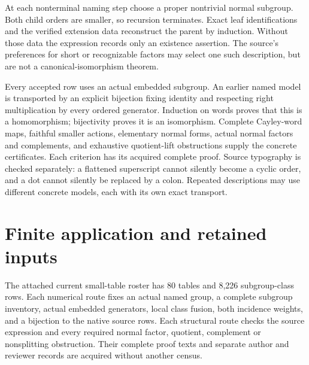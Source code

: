 \documentclass[11pt]{article}
\begin{document}
At each nonterminal naming step choose a proper nontrivial normal subgroup.
Both child orders are smaller, so recursion terminates. Exact leaf
identifications and the verified extension data reconstruct the parent by
induction. Without those data the expression records only an existence
assertion. The source's preferences for short or recognizable factors may
select one such description, but are not a canonical-isomorphism theorem.

Every accepted row uses an actual embedded subgroup. An earlier named
model is transported by an explicit bijection fixing identity and respecting
right multiplication by every ordered generator. Induction on words proves
that this is a homomorphism; bijectivity proves it is an isomorphism.
Complete Cayley-word maps, faithful smaller actions, elementary normal forms,
actual normal factors and complements, and exhaustive quotient-lift
obstructions supply the concrete certificates. Each criterion has its
acquired complete proof. Source typography is checked separately: a flattened
superscript cannot silently become a cyclic order, and a dot cannot silently
be replaced by a colon. Repeated descriptions may use different concrete
models, each with its own exact transport.

\section{Finite application and retained inputs}
The attached current small-table roster has 80 tables and 8,226 subgroup-class
rows. Each numerical route fixes an actual named group, a complete subgroup
inventory, actual embedded generators, local class fusion, both incidence
weights, and a bijection to the native source rows. Each structural route
checks the source expression and every required normal factor, quotient,
complement or nonsplitting obstruction. Their complete proof texts and
separate author and reviewer records are acquired without another census.
\end{document}
